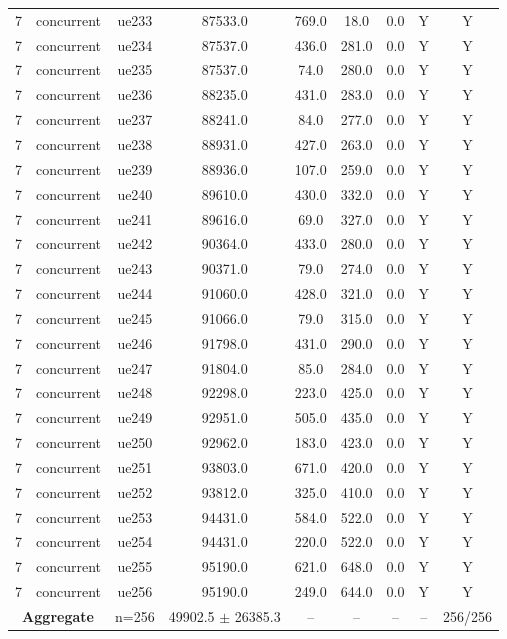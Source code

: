 \begin{table}[ht]
\begin{tabular}{|c|c|c|c|c|c|c|c|c|}
7 & concurrent & ue233 & 87533.0 & 769.0 & 18.0 & 0.0 & Y & Y \\
7 & concurrent & ue234 & 87537.0 & 436.0 & 281.0 & 0.0 & Y & Y \\
7 & concurrent & ue235 & 87537.0 & 74.0 & 280.0 & 0.0 & Y & Y \\
7 & concurrent & ue236 & 88235.0 & 431.0 & 283.0 & 0.0 & Y & Y \\
7 & concurrent & ue237 & 88241.0 & 84.0 & 277.0 & 0.0 & Y & Y \\
7 & concurrent & ue238 & 88931.0 & 427.0 & 263.0 & 0.0 & Y & Y \\
7 & concurrent & ue239 & 88936.0 & 107.0 & 259.0 & 0.0 & Y & Y \\
7 & concurrent & ue240 & 89610.0 & 430.0 & 332.0 & 0.0 & Y & Y \\
7 & concurrent & ue241 & 89616.0 & 69.0 & 327.0 & 0.0 & Y & Y \\
7 & concurrent & ue242 & 90364.0 & 433.0 & 280.0 & 0.0 & Y & Y \\
7 & concurrent & ue243 & 90371.0 & 79.0 & 274.0 & 0.0 & Y & Y \\
7 & concurrent & ue244 & 91060.0 & 428.0 & 321.0 & 0.0 & Y & Y \\
7 & concurrent & ue245 & 91066.0 & 79.0 & 315.0 & 0.0 & Y & Y \\
7 & concurrent & ue246 & 91798.0 & 431.0 & 290.0 & 0.0 & Y & Y \\
7 & concurrent & ue247 & 91804.0 & 85.0 & 284.0 & 0.0 & Y & Y \\
7 & concurrent & ue248 & 92298.0 & 223.0 & 425.0 & 0.0 & Y & Y \\
7 & concurrent & ue249 & 92951.0 & 505.0 & 435.0 & 0.0 & Y & Y \\
7 & concurrent & ue250 & 92962.0 & 183.0 & 423.0 & 0.0 & Y & Y \\
7 & concurrent & ue251 & 93803.0 & 671.0 & 420.0 & 0.0 & Y & Y \\
7 & concurrent & ue252 & 93812.0 & 325.0 & 410.0 & 0.0 & Y & Y \\
7 & concurrent & ue253 & 94431.0 & 584.0 & 522.0 & 0.0 & Y & Y \\
7 & concurrent & ue254 & 94431.0 & 220.0 & 522.0 & 0.0 & Y & Y \\
7 & concurrent & ue255 & 95190.0 & 621.0 & 648.0 & 0.0 & Y & Y \\
7 & concurrent & ue256 & 95190.0 & 249.0 & 644.0 & 0.0 & Y & Y \\
\multicolumn{2}{|c|}{\textbf{Aggregate}} & n=256 & 49902.5 $\pm$ 26385.3 & -- & -- & -- & -- & 256/256 \\

\end{tabular}
\end{table}
